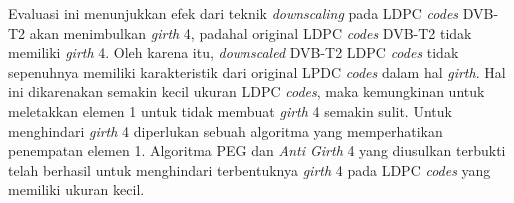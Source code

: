 Evaluasi ini menunjukkan efek dari teknik \textit{downscaling} pada LDPC \textit{codes} DVB-T2 akan menimbulkan \textit{girth} 4, padahal original LDPC \textit{codes} DVB-T2 tidak memiliki \textit{girth} 4. Oleh karena itu, \textit{downscaled} DVB-T2 LDPC \textit{codes} tidak sepenuhnya memiliki karakteristik dari original LPDC \textit{codes} dalam hal \textit{girth}. Hal ini dikarenakan semakin kecil ukuran LDPC \textit{codes}, maka kemungkinan untuk meletakkan elemen 1 untuk tidak membuat \textit{girth} 4 semakin sulit. Untuk menghindari \textit{girth} 4 diperlukan sebuah algoritma yang memperhatikan penempatan elemen 1. Algoritma PEG dan \textit{Anti Girth} 4 yang diusulkan terbukti telah berhasil untuk menghindari terbentuknya \textit{girth} 4 pada LDPC \textit{codes} yang memiliki ukuran kecil. 

%		
%
%
%
%		
%	





